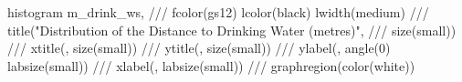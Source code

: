 histogram m_drink_ws, ///
fcolor(gs12) lcolor(black) lwidth(medium) ///
title("Distribution of the Distance to Drinking Water (metres)", ///
          size(small)) ///
xtitle(, size(small)) ///                               
ytitle(, size(small)) ///                               
ylabel(, angle(0) labsize(small)) ///
xlabel(, labsize(small)) ///
graphregion(color(white))                               
